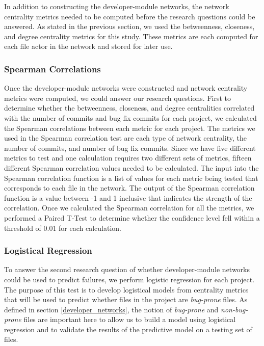 \documentclass{sig-alternate-05-2015}
\begin{document}
In addition to constructing the developer-module networks, the network centrality metrics needed to be computed before the research questions could be answered. As stated in the previous section, we used the betweenness, closeness, and degree centrality metrics for this study. These metrics are each computed for each file actor in the network and stored for later use.

\subsubsection{Spearman Correlations}
Once the developer-module networks were constructed and network centrality metrics were computed, we could answer our research questions. First to determine whether the betweenness, closeness, and degree centralities correlated with the number of commits and bug fix commits for each project, we calculated the Spearman correlations between each metric for each project. The metrics we used in the Spearman correlation test are each type of network centrality, the number of commits, and number of bug fix commits. Since we have five different metrics to test and one calculation requires two different sets of metrics, fifteen different Spearman correlation values needed to be calculated. The input into the Spearman correlation function is a list of values for each metric being tested that corresponds to each file in the network. The output of the Spearman correlation function is a value between -1 and 1 inclusive that indicates the strength of the correlation. Once we calculated the Spearman correlation for all the metrics, we performed a Paired T-Test to determine whether the confidence level fell within a threshold of 0.01 for each calculation.

\subsubsection{Logistical Regression}
To answer the second research question of whether developer-module networks could be used to predict failures, we perform logistic regression for each project. The purpose of this test is to develop logistical models from centrality metrics that will be used to predict whether files in the project are \textit{bug-prone} files. As defined in section \ref{developer_networks}, the notion of \textit{bug-prone} and \textit{non-bug-prone} files are important here to allow us to build a model using logistical regression and to validate the results of the predictive model on a testing set of files.
\end{document}
